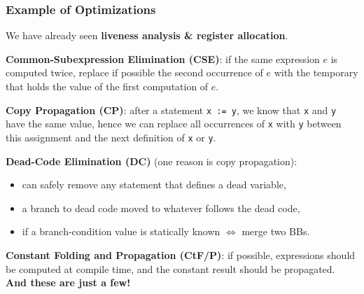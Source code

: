 \documentclass{beamer}
\newcommand{\emp}[1]{\textcolor{DikuRed}{ #1}}
\begin{document}
\begin{frame}[fragile,t]
    \frametitle{Example of Optimizations}

We have already seen \emp{\bf liveness analysis \& register allocation}.

\bigskip

\emp{\bf Common-Subexpression Elimination (CSE)}: if the same expression
$e$ is computed twice, replace if possible the second occurrence of $e$
with the temporary that holds the value of the first computation of $e$.

\bigskip

\emp{\bf Copy Propagation (CP)}: after a statement {\tt x~:=~y}, 
we know that {\tt x} and {\tt y} have the same value, hence we can replace 
all occurrences of {\tt x} with {\tt y} between this assignment and the next 
definition of {\tt x} or {\tt y}.

\bigskip

\emp{\bf Dead-Code Elimination (DC)} (one reason is copy propagation):
\begin{itemize}
    \item can safely remove any statement that defines a dead variable,
    \item a branch to dead code moved to whatever follows the dead code,
    \item if a branch-condition value is statically known $\Leftrightarrow$ merge two BBs.
\end{itemize}

\bigskip

\emp{\bf Constant Folding and Propagation (CtF/P)}: if possible,
expressions should be computed at compile time, and the constant
result should be propagated. {\bf And these are just a few!}


\end{frame}
\end{document}
